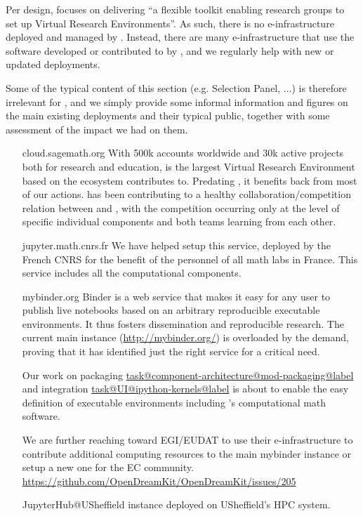 \documentclass{deliverablereport}
\makeatletter
\newcommand\localtaskref[2]{\hyperref[#1@#2]{\csname task@#1@#2@label\endcsname}}
\makeatother
\begin{document}
Per design, \ODK focuses on delivering ``a flexible toolkit enabling
research groups to set up Virtual Research Environments''. As such,
there is no e-infrastructure deployed and managed by \ODK. Instead,
there are many e-infrastructure that use the software developed or
contributed to by \ODK, and we regularly help with new or updated
deployments.

Some of the typical content of this section (e.g. Selection Panel,
...) is therefore irrelevant for \ODK, and we simply provide some
informal information and figures on the main existing deployments and
their typical public, together with some assessment of the impact we
had on them.

\begin{itemize}
\item[cloud.sagemath.org] With 500k accounts worldwide and 30k active
  projects both for research and education, \SMC is the largest
  Virtual Research Environment based on the ecosystem \ODK contributes
  to. Predating \ODK, it benefits back from most of our actions. \ODK
  has been contributing to a healthy collaboration/competition
  relation between \JupyterHub and \SMC, with the competition
  occurring only at the level of specific individual components and
  both teams learning from each other.

\item[jupyter.math.cnrs.fr] We have helped setup this \JupyterHub
  service, deployed by the French CNRS for the benefit of the
  personnel of all math labs in France. This service includes all the
  \ODK computational components.

\item[mybinder.org] Binder is a web service that makes it easy for any
  user to publish live notebooks based on an arbitrary reproducible
  executable environments. It thus fosters dissemination and
  reproducible research. The current main instance
  (\url{http://mybinder.org/}) is overloaded by the demand, proving
  that it has identified just the right service for a critical need.

  Our work on packaging
  \localtaskref{component-architecture}{mod-packaging} and \Jupyter
  integration \localtaskref{UI}{ipython-kernels} is about to enable
  the easy definition of executable environments including \ODK's
  computational math software.

  We are further reaching toward EGI/EUDAT to use their
  e-infrastructure to contribute additional computing resources to the
  main mybinder instance or setup a new one for the EC community.
  \url{https://github.com/OpenDreamKit/OpenDreamKit/issues/205}

\item [JupyterHub@USheffield]
  \href{http://docs.iceberg.shef.ac.uk/en/latest/using-iceberg/accessing/jupyterhub.html}{\JupyterHub}
  instance deployed on USheffield's HPC system.
\end{itemize}
\end{document}
